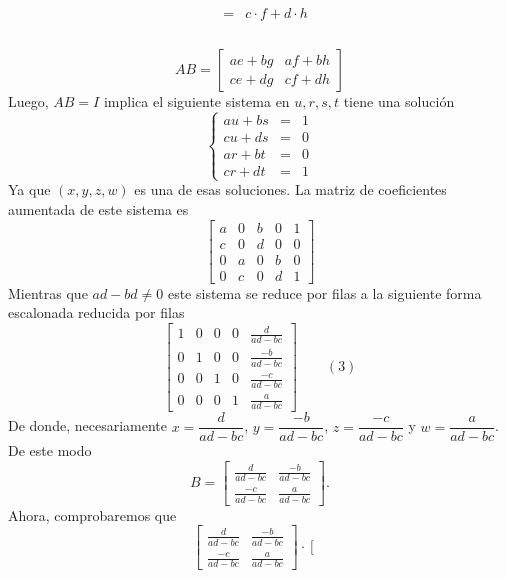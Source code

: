 \begin{enumerate}[1.]
$$\begin{array}{c|c}
\begin{array}{rcl}
		       &=& c\cdot f + d\cdot h\\\\
	    \end{array}\\\\
	\end{array}
	$$
	$$AB=
	\left[\begin{array}{rr}
	    ae+bg & af+bh\\
	    ce+dg & cf+dh
	\end{array}\right]
	$$
	Luego, $AB=I$ implica el siguiente sistema en $u,r,s,t$ tiene una solución
	$$
	\left\{
	    \begin{array}{rcr}
		au+bs &=& 1\\
		cu+ds &=& 0\\
		ar+bt &=& 0\\
		cr+dt &=& 1
	    \end{array}
	\right.
	$$
	Ya que $(x,y,z,w)$ es una de esas soluciones. La matriz de coeficientes aumentada de este sistema es
	$$
	\left[\begin{array}{rrrr|r}
	    a & 0 & b & 0 & 1\\
	    c & 0 & d & 0 & 0\\
	    0 & a & 0 & b & 0\\
	    0 & c & 0 & d & 1
	\end{array}\right]
	$$
	Mientras que $ad-bd\neq 0$ este sistema se reduce por filas a la siguiente forma escalonada reducida por filas
	$$
	\left[\begin{array}{rrrr|r}
	    1 & 0 & 0 & 0 & \frac{d}{ad-bc}\\
	    0 & 1 & 0 & 0 & \frac{-b}{ad-bc}\\
	    0 & 0 & 1 & 0 & \frac{-c}{ad-bc}\\
	    0 & 0 & 0 & 1 & \frac{a}{ad-bc}
	\end{array}\right] \qquad (3)
	$$
	De donde, necesariamente $x=\dfrac{d}{ad-bc}$, $y=\dfrac{-b}{ad-bc}$, $z=\dfrac{-c}{ad-bc}$ y $w=\dfrac{a}{ad-bc}$. De este modo
	$$
	B=
	\left[\begin{array}{rr}
		\frac{d}{ad-bc} & \frac{-b}{ad-bc}\\
		\frac{-c}{ad-bc} & \frac{a}{ad-bc}
	\end{array}\right].
	$$
	Ahora, comprobaremos que 
	$$
	\left[\begin{array}{rr}
		\frac{d}{ad-bc} & \frac{-b}{ad-bc}\\
		\frac{-c}{ad-bc} & \frac{a}{ad-bc}
	\end{array}\right]
	\cdot
	\left[\begin{array}{rr}

\end{array}$$
\end{enumerate}
